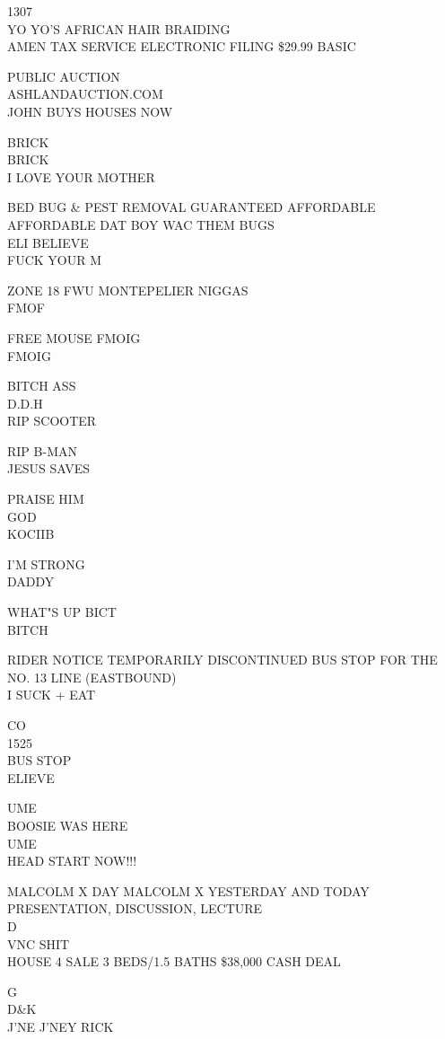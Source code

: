 \documentclass[10pt,letterpaper]{article}
\begin{document}
1307\\
YO YO'S AFRICAN HAIR BRAIDING\\
AMEN TAX SERVICE ELECTRONIC FILING \$29.99 BASIC

PUBLIC AUCTION\\
ASHLANDAUCTION.COM\\
JOHN BUYS HOUSES NOW

BRICK\\
BRICK\\
I LOVE YOUR MOTHER

BED BUG \& PEST REMOVAL GUARANTEED AFFORDABLE AFFORDABLE DAT BOY WAC THEM BUGS\\
ELI BELIEVE\\
FUCK YOUR M

ZONE 18 FWU MONTEPELIER NIGGAS\\
FMOF

FREE MOUSE FMOIG\\
FMOIG

BITCH ASS\\
D.D.H\\
RIP SCOOTER

RIP B{-}MAN\\
JESUS SAVES

PRAISE HIM\\
GOD\\
KOCIIB

I'M STRONG\\
DADDY

WHAT"S UP BICT\\
BITCH

RIDER NOTICE TEMPORARILY DISCONTINUED BUS STOP FOR THE NO. 13 LINE (EASTBOUND)\\
I SUCK + EAT

CO\\
1525\\
BUS STOP\\
ELIEVE

UME\\
BOOSIE WAS HERE\\
UME\\
HEAD START NOW!!!

MALCOLM X DAY MALCOLM X YESTERDAY AND TODAY PRESENTATION, DISCUSSION, LECTURE\\
D\\
VNC SHIT\\
HOUSE 4 SALE 3 BEDS/1.5 BATHS \$38,000 CASH DEAL

G\\
D\&K\\
J'NE J'NEY RICK
\end{document}
